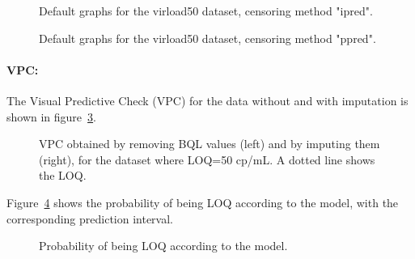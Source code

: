 \begin{figure}[!h]
\par\kern -0.5cm
\begin{center}
\end{center}
\par\kern -0.5cm
\caption{Default graphs for the virload50 dataset, censoring method {\sf "ipred"}.}\label{fig:x50.ipred}
\end{figure}

\clearpage
\begin{figure}[!h]
\par\kern -0.5cm
\begin{center}
\end{center}
\par\kern -0.5cm
\caption{Default graphs for the virload50 dataset, censoring method {\sf "ppred"}.}\label{fig:x50.ppred}
\end{figure}

\paragraph{VPC:} The Visual Predictive Check (VPC) for the data without and with imputation is shown in figure~\ref{fig:x50.vpc}.

\begin{figure}[!h]
\par\kern -1cm
\begin{center}
\end{center}
\par\kern -6.5cm
\caption{VPC obtained by removing BQL values (left) and by imputing them (right), for the dataset where LOQ=50 cp/mL. A dotted line shows the LOQ.}\label{fig:x50.vpc}
\end{figure}
\clearpage

Figure~\ref{fig:x50.ploq} shows the probability of being LOQ according to the model, with the corresponding prediction interval.
\begin{figure}[!h]
\par\kern -0.3cm
\begin{center}
\end{center}
\caption{Probability of being LOQ according to the model.}\label{fig:x50.ploq}
\end{figure}


